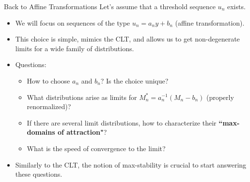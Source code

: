 \documentclass[10pt, hyperref={colorlinks = true,linkcolor = blue}]{beamer}
\begin{document}
{{\begin{frame}{Back to Affine Transformations}
Let's assume that a threshold sequence $u_n$ exists.
\begin{itemize}
    \item We will focus on sequences of the type $u_n = a_n y + b_n$ (affine transformation).
    \item This choice is simple, mimics the CLT, and allows us to get non-degenerate limits for a wide family of distributions.
    \item Questions:
    \begin{itemize}
        \item How to choose $a_n$ and $b_n$? Is the choice unique?
        \item What distributions arise as limits for $M^*_n = a_n^{-1} (M_n - b_n)$ (properly renormalized)?
        \item If there are several limit distributions, how to characterize their \textbf{``max-domains of attraction"}? 
        \item What is the speed of convergence to the limit?
    \end{itemize}
    \item Similarly to the CLT, the notion of max-stability is crucial to start answering these questions.
\end{itemize}

\end{frame}

}}
\end{document}
